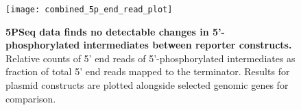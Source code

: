 \documentclass[../main.tex]{subfiles}
\begin{document}
\begin{figure}[h!]

{\centering \texttt{[image: combined\_5p\_end\_read\_plot]} 

}

\caption[5PSeq data finds no detectable changes in 5'-phosphorylated intermediates between reporter constructs.]{\textbf{5PSeq data finds no detectable changes in 5'-phosphorylated intermediates between reporter constructs.} Relative counts of 5' end reads of 5'-phosphorylated intermediates as fraction of total 5' end reads mapped to the terminator. Results for plasmid constructs are plotted alongside selected genomic genes for comparison.}\label{fig:combined-5p-end-read-plot}
\end{figure}
\end{document}
